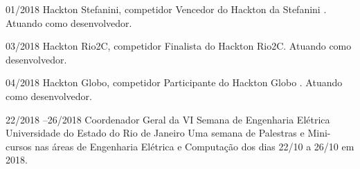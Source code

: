 \documentclass[]{friggeri-cv} %
\begin{document}
\begin{entrylist}
\entry
{01/2018}
{\hspace{.15cm}Hackton Stefanini, competidor}
{}
{Vencedor do Hackton da Stefanini . Atuando como desenvolvedor.}

\entry
{03/2018 }
{\hspace{.15cm}Hackton Rio2C, competidor}
{}
{Finalista do Hackton Rio2C. Atuando como desenvolvedor.}

\entry
{04/2018 }
{\hspace{.15cm}Hackton Globo, competidor}
{}
{Participante do Hackton Globo . Atuando como desenvolvedor.}



\entry
{22/2018 --26/2018}
{\hspace{.15cm} Coordenador Geral da VI Semana de Engenharia Elétrica }
{Universidade do Estado do Rio de Janeiro}
{Uma semana de Palestras e Mini-cursos nas áreas de Engenharia Elétrica e Computação dos dias 22/10 a 26/10 em 2018.}




\end{entrylist}




\end{document}
